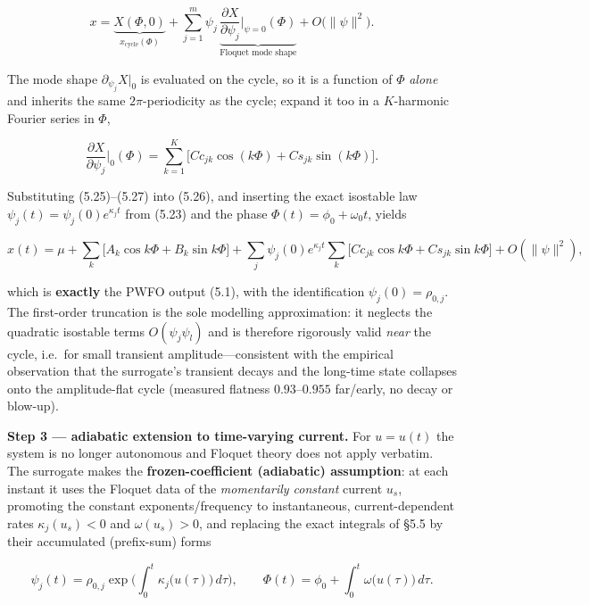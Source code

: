 \documentclass[
  11pt,
]{article}
\providecommand{\lt}{<}
\providecommand{\gt}{>}
\begin{document}
\[
x=\underbrace{X(\Phi,0)}_{x_{\text{cycle}}(\Phi)}
+\sum_{j=1}^{m}\psi_j\,\underbrace{\frac{\partial X}{\partial\psi_j}\Big|_{\psi=0}(\Phi)}_{\text{Floquet mode shape}}
+O\!\big(\|\psi\|^2\big).
\tag{5.26}
\]

The mode shape \(\partial_{\psi_j}X|_{0}\) is evaluated on the cycle, so
it is a function of \(\Phi\) \emph{alone} and inherits the same
\(2\pi\)-periodicity as the cycle; expand it too in a \(K\)-harmonic
Fourier series in \(\Phi\),

\[
\frac{\partial X}{\partial\psi_j}\Big|_{0}(\Phi)=\sum_{k=1}^{K}\big[Cc_{jk}\cos(k\Phi)+Cs_{jk}\sin(k\Phi)\big].
\tag{5.27}
\]

Substituting (5.25)--(5.27) into (5.26), and inserting the exact
isostable law \(\psi_j(t)=\psi_j(0)e^{\kappa_j t}\) from (5.23) and the
phase \(\Phi(t)=\phi_0+\omega_0 t\), yields

\[
x(t)=\mu+\sum_{k}\big[A_k\cos k\Phi+B_k\sin k\Phi\big]
+\sum_{j}\psi_j(0)e^{\kappa_j t}\sum_{k}\big[Cc_{jk}\cos k\Phi+Cs_{jk}\sin k\Phi\big]
+O(\|\psi\|^2),
\tag{5.28}
\]

which is \textbf{exactly} the PWFO output (5.1), with the identification
\(\psi_j(0)=\rho_{0,j}\). The first-order truncation is the sole
modelling approximation: it neglects the quadratic isostable terms
\(O(\psi_j\psi_l)\) and is therefore rigorously valid \emph{near} the
cycle, i.e.~for small transient amplitude---consistent with the
empirical observation that the surrogate's transient decays and the
long-time state collapses onto the amplitude-flat cycle (measured
flatness \(0.93\)--\(0.955\) far/early, no decay or blow-up).

\textbf{Step 3 --- adiabatic extension to time-varying current.} For
\(u=u(t)\) the system is no longer autonomous and Floquet theory does
not apply verbatim. The surrogate makes the \textbf{frozen-coefficient
(adiabatic) assumption}: at each instant it uses the Floquet data of the
\emph{momentarily constant} current \(u_s\), promoting the constant
exponents/frequency to instantaneous, current-dependent rates
\(\kappa_j(u_s)\lt 0\) and \(\omega(u_s)\gt 0\), and replacing the exact
integrals of §5.5 by their accumulated (prefix-sum) forms

\[
\psi_j(t)=\rho_{0,j}\exp\!\Big(\int_0^t\kappa_j\big(u(\tau)\big)\,d\tau\Big),
\qquad
\Phi(t)=\phi_0+\int_0^t\omega\big(u(\tau)\big)\,d\tau .
\tag{5.29}
\]
\end{document}
